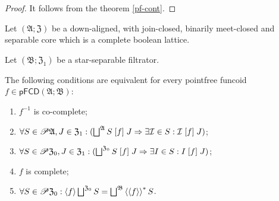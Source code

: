 \begin{proof}
It follows from the theorem \ref{pf-cont}.\end{proof}
\begin{thm}
\label{pf-compl-conds}Let $(\mathfrak{A};\mathfrak{Z})$ be a down-aligned,
with join-closed, binarily meet-closed and separable core which is
a complete boolean lattice.

Let $(\mathfrak{B};\mathfrak{Z}_{1})$ be a star-separable filtrator.

The following conditions are equivalent for every pointfree funcoid
$f\in\mathsf{pFCD}(\mathfrak{A};\mathfrak{B})$:
\begin{enumerate}
\item \label{pf-ax:fcd-full-main}$f^{-1}$ is co-complete;
\item \label{pf-ax:fcd-full-fa-filt}$\forall S\in\mathscr{P}\mathfrak{A},J\in\mathfrak{Z}_{1}:(\bigsqcup^{\mathfrak{A}}S\mathrel{\left[f\right]}J\Rightarrow\exists\mathcal{I}\in S:\mathcal{I}\mathrel{\left[f\right]}J)$;
\item \label{pf-ax:fcd-full-fa-set}$\forall S\in\mathscr{P}\mathfrak{Z}_{0},J\in\mathfrak{Z}_{1}:(\bigsqcup^{\mathfrak{Z}_{0}}S\mathrel{\left[f\right]}J\Rightarrow\exists I\in S:I\mathrel{\left[f\right]}J)$;
\item \label{pf-ax:fcd-full-eq-filt}$f$ is complete;
\item \label{pf-ax:fcd-full-eq-set}$\forall S\in\mathscr{P}\mathfrak{Z}_{0}:\left\langle f\right\rangle\bigsqcup^{\mathfrak{Z}_{0}}S=\bigsqcup^{\mathfrak{B}}\left\langle \left\langle f\right\rangle\right\rangle ^{\ast}S$.
\end{enumerate}
\end{thm}
